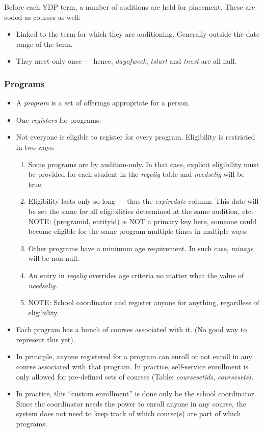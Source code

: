 \documentclass[11pt]{article}
\begin{document}
Before each YDP term, a number of auditions are held for placement.  These are coded as courses as well:
 \begin{itemize}
 \item Linked to the term for which they are auditioning.  Generally outside the date range of the term.
 \item They meet only once --- hence, \emph{dayofweek}, \emph{tstart} and \emph{tnext} are all null.
 \end{itemize}

\subsubsection{Programs}

 \begin{itemize}
 \item A \emph{program} is a set of offerings appropriate for a person.
 \item One \emph{registers} for programs.
 \item Not everyone is eligible to register for every program.  Eligibility is restricted in two ways:
 \begin{enumerate}
	 \item Some programs are by audition-only.  In that case, explicit eligibility must be provided for each student in the \emph{regelig} table and \emph{needselig} will be true.
	\item Eligibility lasts only so long --- thus the \emph{expiredate} column.  This date will be set the same for all eligibilities determined at the same audition, etc.  NOTE: (programid, entityid) is NOT a primary key here, someone could become eligible for the same program multiple times in multiple ways.
	 \item Other programs have a minimum age requirement.  In such case, \emph{minage} will be non-null.
	 \item An entry in \emph{regelig} overrides age criteria no matter what the value of \emph{needselig}.
	\item NOTE: School coordinator and register anyone for anything, regardless of eligibility.
 \end{enumerate}
 \item Each program has a bunch of courses associated with it.  (No good way to represent this yet).
 \item In principle, anyone registered for a program can enroll or not enroll in any course associated with that program.  In practice, self-service enrollment is only allowed for pre-defined sets of courses (Table: \emph{coursesetids}, \emph{coursesets}).
 \item In practice, this ``custom enrollment'' is done only be the school coordinator.  Since the coordinator needs the power to enroll anyone in any course, the system does not need to keep track of which course(s) are part of which programs.
 \end{itemize}
\end{document}
